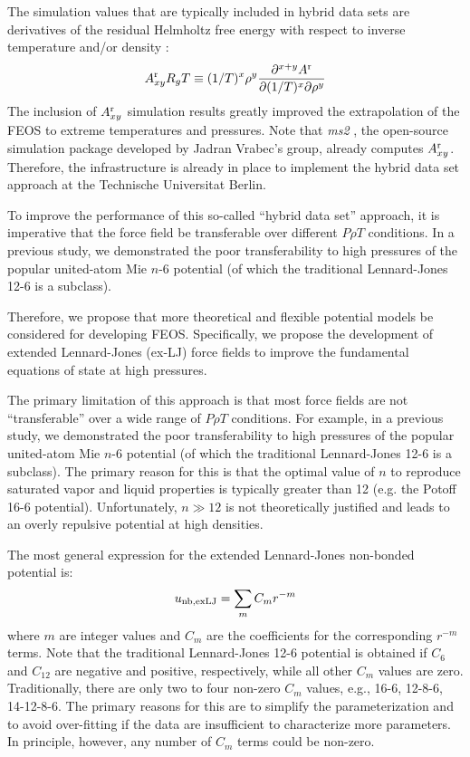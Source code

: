 \documentclass[11pt,a4paper]{article}
\begin{document}
The simulation values that are typically included in hybrid data sets are derivatives of the residual Helmholtz free energy with respect to inverse temperature and/or density \cite{Thol2016_siloxane_first,Thol2016_siloxane,Thol2017,Rutkai2013,Thol2015}:
\begin{equation} \label{Residual Derivatives}
A_{xy}^{\rm r} R_gT \equiv (1/T)^x\rho^y \frac{\partial^{x+y}A^{\rm r}}{\partial(1/T)^x \partial \rho^y}
\end{equation}
The inclusion of $A_{xy}^{\rm r}$ simulation results greatly improved the extrapolation of the FEOS to extreme temperatures and pressures.
Note that \textit{ms2} \cite{ms2}, the open-source simulation package developed by Jadran Vrabec's group, already computes $A_{xy}^{\rm r}$. Therefore, the infrastructure is already in place to implement the hybrid data set approach at the Technische Universitat Berlin.

To improve the performance of this so-called ``hybrid data set'' approach, it is imperative that the force field be transferable over different $P \rho T$ conditions. In a previous study, we demonstrated the poor transferability to high pressures of the popular united-atom Mie $n$-6 potential (of which the traditional Lennard-Jones 12-6 is a subclass). 

Therefore, we propose that more theoretical and flexible potential models be considered for developing FEOS. Specifically, we propose the development of extended Lennard-Jones (ex-LJ) force fields to improve the fundamental equations of state at high pressures.

The primary limitation of this approach is that most force fields are not ``transferable'' over a wide range of $P \rho T$ conditions. For example, in a previous study, we demonstrated the poor transferability to high pressures of the popular united-atom Mie $n$-6 potential (of which the traditional Lennard-Jones 12-6 is a subclass). The primary reason for this is that the optimal value of $n$ to reproduce saturated vapor and liquid properties is typically greater than 12 (e.g. the Potoff 16-6 potential). Unfortunately, $n \gg 12$ is not theoretically justified and leads to an overly repulsive potential at high densities. 

The most general expression for the extended Lennard-Jones non-bonded potential is:
\begin{equation} \label{ex-LJ general}
u_{\rm nb, exLJ} = \sum_m C_m r^{-m} 
\end{equation} 
where $m$ are integer values and $C_m$ are the coefficients for the corresponding $r^{-m}$ terms. Note that the traditional Lennard-Jones 12-6 potential is obtained if $C_6$ and $C_{12}$ are negative and positive, respectively, while all other $C_m$ values are zero. Traditionally, there are only two to four non-zero $C_m$ values, e.g., 16-6, 12-8-6, 14-12-8-6. The primary reasons for this are to simplify the parameterization and to avoid over-fitting if the data are insufficient to characterize more parameters. In principle, however, any number of $C_m$ terms could be non-zero. 
\end{document}

